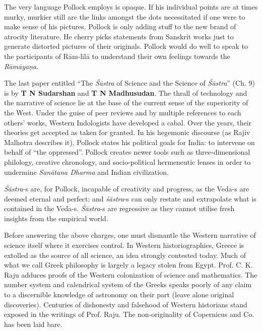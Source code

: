 The very language Pollock employs is opaque. If his individual points are at times murky, murkier still are the links amongst the dots necessitated if one were to make sense of his pictures. Pollock is only adding stuff to the new brand of atrocity literature. He cherry picks statements from Sanskrit works just to generate distorted pictures of their originals. Pollock would do well to speak to the participants of Rām-līlā to understand their own feelings towards the \textit{Rāmāyaṇa}.

The last paper entitled “The \textit{Śāstra} of Science and the Science of \textit{Śāstra}” (Ch. 9) is by \textbf{T N Sudarshan} and \textbf{T N Madhusudan}. The thrall of technology and the narrative of science lie at the base of the current sense of the superiority of the West. Under the guise of peer reviews and by multiple references to each others’ works, Western Indologists have developed a cabal. Over the years, their theories get accepted as taken for granted. In his hegemonic discourse (as Rajiv Malhotra describes it), Pollock states his political goals for India: to intervene on behalf of “the oppressed”. Pollock creates newer tools such as three-dimensional philology, creative chronology, and socio-political hermeneutic lenses in order to undermine \textit{Sanātana Dharma} and Indian civilization.

\textit{Śāstra}-s are, for Pollock, incapable of creativity and progress, as the Veda-s are deemed eternal and perfect; and \textit{śāstra}-s can only restate and extrapolate what is contained in the Veda-s. \textit{Śāstra}-s are regressive as they cannot utilise fresh insights from the empirical world.

Before answering the above charges, one must dismantle the Western narrative of science itself where it exercises control. In Western historiographies, Greece is extolled as the source of all science, an idea strongly contested today. Much of what we call Greek philosophy is largely a legacy stolen from Egypt. Prof. C. K. Raju adduces proofs of the Western colonization of science and mathematics. The number system and calendrical system of the Greeks speaks poorly of any claim to a discernible knowledge of astronomy on their part (leave alone original discoveries). Centuries of dishonesty and falsehood of Western historians stand exposed in the writings of Prof. Raju. The non-originality of Copernicus and Co. has been laid bare. 

